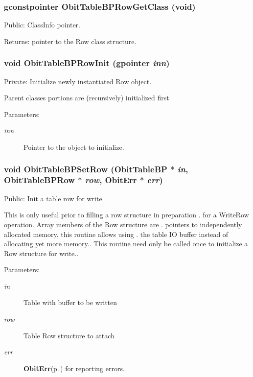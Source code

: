 \subsubsection{\setlength{\rightskip}{0pt plus 5cm}gconstpointer Obit\-Table\-BPRow\-Get\-Class (void)}\label{ObitTableBP_8c_a15}


Public: Class\-Info pointer. 

\begin{Desc}
\item[Returns:]pointer to the Row class structure. \end{Desc}
\subsubsection{\setlength{\rightskip}{0pt plus 5cm}void Obit\-Table\-BPRow\-Init (gpointer {\em inn})}\label{ObitTableBP_8c_a6}


Private: Initialize newly instantiated Row object. 

Parent classes portions are (recursively) initialized first \begin{Desc}
\item[Parameters:]
\begin{description}
\item[{\em inn}]Pointer to the object to initialize. \end{description}
\end{Desc}
\subsubsection{\setlength{\rightskip}{0pt plus 5cm}void Obit\-Table\-BPSet\-Row ({\bf Obit\-Table\-BP} $\ast$ {\em in}, {\bf Obit\-Table\-BPRow} $\ast$ {\em row}, {\bf Obit\-Err} $\ast$ {\em err})}\label{ObitTableBP_8c_a23}


Public: Init a table row for write. 

This is only useful prior to filling a row structure in preparation . for a Write\-Row operation. Array members of the Row structure are . pointers to independently allocated memory, this routine allows using . the table IO buffer instead of allocating yet more memory.. This routine need only be called once to initialize a Row structure for write.. \begin{Desc}
\item[Parameters:]
\begin{description}
\item[{\em in}]Table with buffer to be written \item[{\em row}]Table Row structure to attach \item[{\em err}]{\bf Obit\-Err}{\rm (p.\,\pageref{structObitErr})} for reporting errors. \end{description}
\end{Desc}
